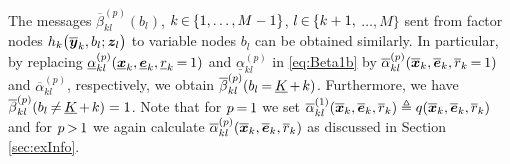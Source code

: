 \documentclass[10pt, twoside, romanappendices]{IEEEtran}
\providecommand{\rmv}{\hspace*{-.3mm}}
\begin{document}
The messages $\overline{\beta}_{kl}^{(p)}(b_{l})$, $k \rmv\in\rmv \{1,\dots,M-1\}$, $l \rmv\in\rmv \{k+1,$ $\dots,M\}$ sent from factor nodes $h_k\big( \overline{\bm{y}}_{k}, b_{l}; \bm{z}_l \big)$ to variable nodes $b_{l}$ can be obtained similarly. In particular, by replacing $\underline{\alpha}_{kl}^{(p)}(\underline{\V{x}}_{k},\underline{\V{e}}_{k},\underline{r}_{k} \rmv=\rmv 1)$ and $\underline{\alpha}_{kl}^{(p)}$  in \vspace{.5mm}\eqref{eq:Beta1b} by $\overline{\alpha}_{kl}^{(p)}(\overline{\V{x}}_{k},\overline{\V{e}}_{k},\overline{r}_{k} \rmv=\rmv 1)$ and  $\overline{\alpha}_{kl}^{(p)}$, respectively, we obtain $\overline{\beta}_{kl}^{(p)}(b_{l} \rmv=\rmv \underline{K} \rmv+\rmv k)$. Furthermore, we have $\overline{\beta}_{kl}^{(p)}(b_{l} \rmv \neq\rmv \underline{K} \rmv+\rmv k) = 1$. Note that for $p \rmv=\rmv 1$ we set  $\overline{\alpha}_{kl}^{(1)}(\overline{\bm{x}}_{k},\overline{\bm{e}}_{k},\overline{r}_{k})  \triangleq q(\overline{\bm{x}}_{k},\overline{\bm{e}}_{k},\overline{r}_{k})$ and for $p\rmv>\rmv1$ we again calculate $\overline{\alpha}_{kl}^{(p)}(\overline{\bm{x}}_{k},\overline{\bm{e}}_{k},\overline{r}_{k})$\vspace{1mm} as discussed in Section \ref{sec:exInfo}.
\end{document}
